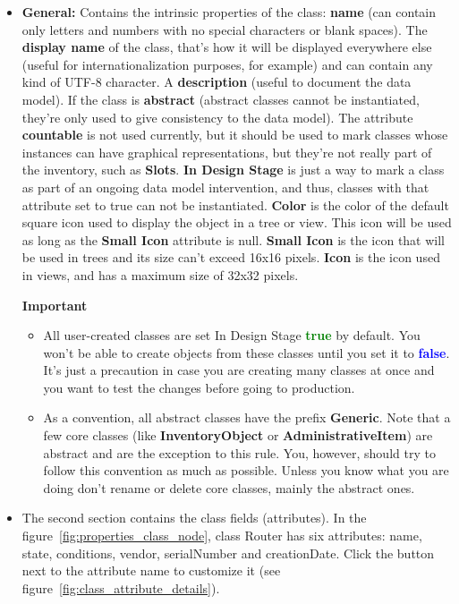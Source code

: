 \documentclass[a4paper]{article}
\begin{document}
			\begin{itemize}
				\item \textbf{General:} Contains the intrinsic properties  of  the class: \textbf{name} (can contain only letters and numbers with no special characters  or  blank  spaces). The  \textbf{display name} of the class, that's how it  will be displayed everywhere else (useful  for  internationalization  purposes, for example) and can contain any kind of UTF-8 character. A \textbf{description} (useful  to  document  the  data  model). If  the class is \textbf{abstract} (abstract classes  cannot  be  instantiated, they're only used to give consistency to the  data  model). The attribute \textbf{countable} is not used currently, but it should be used to mark classes whose instances can have graphical representations, but  they're  not really  part  of  the  inventory,  such  as  \textbf{Slots}. \textbf{In Design Stage} is just a way to mark a class as part of an ongoing data model intervention, and thus, classes with that attribute set to true can not be instantiated. \textbf{Color} is the color of the default square icon used to display the object in a tree or view. This icon will be used as long as the \textbf{Small Icon} attribute is null. \textbf{Small Icon} is the icon that will be used in trees and its size can't exceed 16x16 pixels. \textbf{Icon} is the icon used in views, and has a maximum size of 32x32 pixels.
				\begin{framed} {\large \textbf{Important}}
					\begin{itemize}
						\item All user-created classes are set In Design Stage \textbf{\textcolor{green}{true}} by default. You won't be able to create objects from these classes until you set it to \textbf{\textcolor{blue}{false}}. It's just a precaution in case you are creating many classes at once and you want to test the changes before going to production.
						\item As a convention, all abstract classes have the prefix \textbf{Generic}. Note that a few core classes (like \textbf{InventoryObject} or \textbf{AdministrativeItem}) are abstract and are the exception to this rule. You, however, should try to follow this convention as much as possible. Unless you know what you are doing don't rename or delete core classes, mainly the abstract ones.
					\end{itemize}
				\end{framed}
				\item The second section  contains the class fields (attributes). In the  figure~\ref{fig:properties_class_node}, class Router  has six attributes: name, state, conditions, vendor, serialNumber and creationDate. Click the button next to the attribute name to customize it (see figure~\ref{fig:class_attribute_details}).

\end{itemize}
\end{document}
